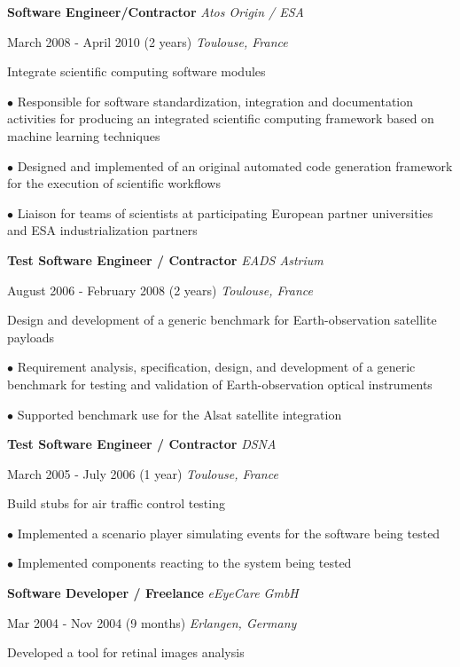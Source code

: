 \documentclass[12pt]{article}
\newcommand{\mynewsection}[2]{%
  \medskip

  \textbf{\color{colorsection}\LARGE {#2}\hspace{0.25in}{#1}}
}
\newcommand{\experience}[4]{%
  \medskip
  {\color{colorsection}\textbf{\large #1}}
  \hfill
  \textit{\small #2}

  {\small #3}
  \hfill    
  \textit{\small #4}}
\begin{document}
\begin{minipage}[t]{0.67\linewidth}
  \mynewsection{Experience (cont.)}{\faBriefcase}
  
  \experience{Software Engineer/Contractor}{Atos Origin /
    ESA}{March 2008 - April 2010 (2 years)}{Toulouse, France}

  \medskip

  {\large Integrate scientific computing software modules}

  \medskip

  $\bullet$ Responsible for software standardization, integration and
  documentation activities for producing an integrated scientific
  computing framework based on machine learning techniques

  \medskip
  
  $\bullet$ Designed and implemented of an original automated code
  generation framework for the execution of scientific workflows

  \medskip

  $\bullet$ Liaison for teams of scientists at participating European
  partner universities and ESA industrialization partners

  \bigskip
  
  \experience{Test Software Engineer / Contractor}{%
    EADS Astrium}{%
    August 2006 - February 2008 (2 years)}{%
    Toulouse, France}
  
  \medskip

  {\large Design and development of a generic benchmark for
    Earth-observation satellite payloads}

  \medskip

  $\bullet$ Requirement analysis, specification, design, and
  development of a generic benchmark for testing and validation of
  Earth-observation optical instruments

  \medskip

  $\bullet$ Supported benchmark use for the Alsat satellite
  integration

  \bigskip
  
  \experience{Test Software Engineer / Contractor}{%
    DSNA}{%
    March 2005 - July 2006 (1 year)}{%
    Toulouse, France}

  \medskip
  
  {\large Build stubs for air traffic control testing}

  \medskip

  $\bullet$ Implemented a scenario player simulating events for the
  software being tested

  \medskip

  $\bullet$ Implemented components reacting to the system being tested

  \bigskip
  
  \experience{Software Developer / Freelance}{%
    eEyeCare GmbH}{%
    Mar 2004 - Nov 2004 (9 months)}{%
    Erlangen, Germany}
  
  \medskip

  {\large Developed a tool for retinal images analysis}
  
\end{minipage}
\end{document}
